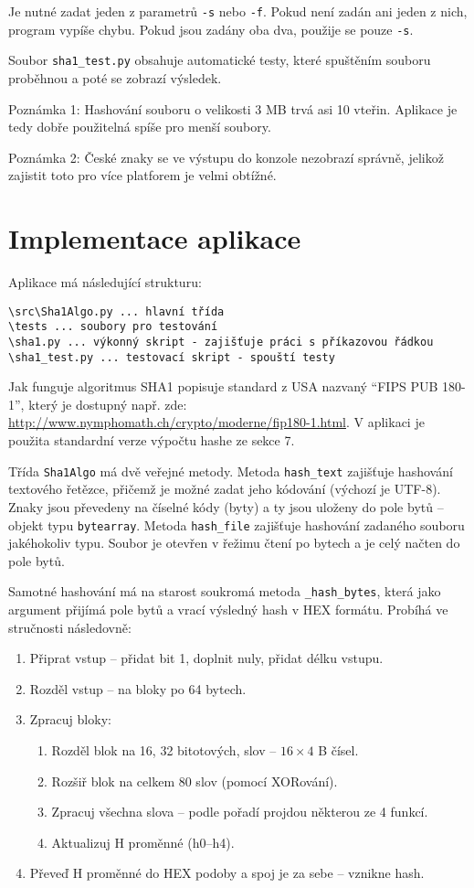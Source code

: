 \documentclass[a4paper]{article}
\begin{document}
Je nutné zadat jeden z parametrů \verb|-s| nebo \verb|-f|. Pokud není zadán ani jeden z nich, program vypíše chybu. Pokud jsou zadány oba dva, použije se pouze  \verb|-s|. 

Soubor \verb|sha1_test.py| obsahuje automatické testy, které spuštěním souboru proběhnou a poté se zobrazí výsledek.

Poznámka 1: Hashování souboru o velikosti 3 MB trvá asi 10 vteřin. Aplikace je tedy dobře použitelná spíše pro menší soubory.

Poznámka 2: České znaky se ve výstupu do konzole nezobrazí správně, jelikož zajistit toto pro více platforem je velmi obtížné.

\section{Implementace aplikace}
Aplikace má následující strukturu:
\begin{verbatim}
\src\Sha1Algo.py ... hlavní třída
\tests ... soubory pro testování
\sha1.py ... výkonný skript - zajišťuje práci s příkazovou řádkou
\sha1_test.py ... testovací skript - spouští testy
\end{verbatim}

Jak funguje algoritmus SHA1 popisuje standard z USA nazvaný ``FIPS PUB 180-1'', který je dostupný např. zde: \url{http://www.nymphomath.ch/crypto/moderne/fip180-1.html}. V aplikaci je použita standardní verze výpočtu hashe ze sekce 7. 

Třída \verb|Sha1Algo| má dvě veřejné metody. Metoda \verb|hash_text| zajišťuje hashování textového řetězce, přičemž je možné zadat jeho kódování (výchozí je UTF-8). Znaky jsou převedeny na číselné kódy (byty) a ty jsou uloženy do pole bytů -- objekt typu \texttt{bytearray}. 
Metoda \verb|hash_file| zajišťuje hashování zadaného souboru jakéhokoliv typu. Soubor je otevřen v řežimu čtení po bytech a je celý načten do pole bytů. 

Samotné hashování má na starost soukromá metoda \verb|_hash_bytes|, která jako argument přijímá pole bytů a vrací výsledný hash v HEX formátu. Probíhá ve stručnosti následovně:
\begin{enumerate}
\item Připrat vstup -- přidat bit 1, doplnit nuly, přidat délku vstupu.
\item Rozděl vstup -- na bloky po 64 bytech.
\item Zpracuj bloky:
	\begin{enumerate}
	\item Rozděl blok na 16, 32 bitotových, slov -- $16\times4$ B čísel.
	\item Rozšiř blok na celkem 80 slov (pomocí XORování).
	\item Zpracuj všechna slova -- podle pořadí projdou některou ze 4 funkcí.
	\item Aktualizuj H proměnné (h0--h4).
	\end{enumerate}
\item Převeď H proměnné do HEX podoby a spoj je za sebe -- vznikne hash.
\end{enumerate}
\end{document}
